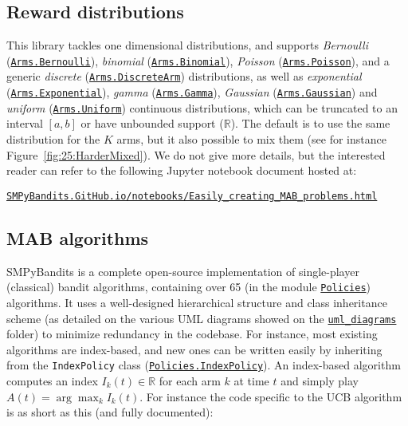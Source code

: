 \subsection{Reward distributions}
%
This library tackles one dimensional distributions,
and supports \emph{Bernoulli} (\texttt{\href{https://smpybandits.github.io/docs/Arms.Bernoulli.html}{Arms.Bernoulli}}), \emph{binomial} (\texttt{\href{https://smpybandits.github.io/docs/Arms.Binomial.html}{Arms.Binomial}}), \emph{Poisson} (\texttt{\href{https://smpybandits.github.io/docs/Arms.Poisson.html}{Arms.Poisson}}), and a generic \emph{discrete} (\texttt{\href{https://smpybandits.github.io/docs/Arms.DiscreteArm.html}{Arms.DiscreteArm}}) distributions,
as well as \emph{exponential} (\texttt{\href{https://smpybandits.github.io/docs/Arms.Exponential.html}{Arms.Exponential}}), \emph{gamma} (\texttt{\href{https://smpybandits.github.io/docs/Arms.Gamma.html}{Arms.Gamma}}), \emph{Gaussian} (\texttt{\href{https://smpybandits.github.io/docs/Arms.Gaussian.html}{Arms.Gaussian}}) and \emph{uniform} (\texttt{\href{https://smpybandits.github.io/docs/Arms.Uniform.html}{Arms.Uniform}}) continuous distributions,
which can be truncated to an interval $[a,b]$ or have unbounded support ($\mathbb{R}$).
%
The default is to use the same distribution for the $K$ arms, but it also possible to mix them (see for instance Figure~\ref{fig:25:HarderMixed}).
%
We do not give more details, but the interested reader can refer to the following Jupyter notebook \cite{jupyter} document hosted at:\\
\begin{small}
    \href{https://smpybandits.github.io/notebooks/Easily_creating_MAB_problems.html}{\texttt{SMPyBandits.GitHub.io/notebooks/Easily\_creating\_MAB\_problems.html}}
\end{small}


\subsection{MAB algorithms}

SMPyBandits is a complete open-source implementation of single-player (classical) bandit algorithms,
containing over 65 (in the module \texttt{\href{https://SMPyBandits.GitHub.io/docs/Policies.html}{Policies}}) algorithms.
It uses a well-designed hierarchical structure and class inheritance scheme (as detailed on the various UML diagrams showed on the \texttt{\href{https://SMPyBandits.GitHub.io/uml_diagrams/README.html}{uml\_diagrams}} folder) to minimize redundancy in the codebase.
For instance, most existing algorithms are index-based, and new ones can be written easily by inheriting from the \texttt{IndexPolicy} class (\texttt{\href{https://SMPyBandits.GitHub.io/docs/Policies.IndexPolicy.html}{Policies.IndexPolicy}}).
An index-based algorithm computes an index $I_k(t)\in\mathbb{R}$ for each arm $k$ at time $t$ and simply play $A(t) = \arg\max_k I_k(t)$.
For instance the code specific to the UCB algorithm \cite{LaiRobbins85,Auer02} is as short as this (and fully documented):

